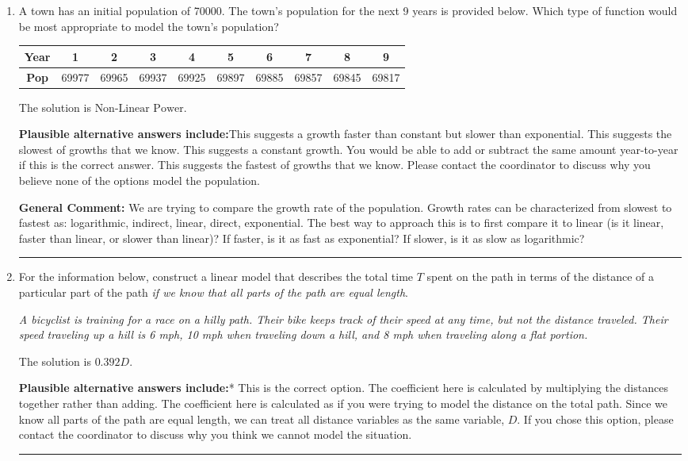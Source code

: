 \documentclass{extbook}[14pt]
\newcommand{\litem}[1]{\item #1

\rule{\textwidth}{0.4pt}}
\begin{document}
\begin{enumerate}\litem{
A town has an initial population of 70000. The town's population for the next 9 years is provided below. Which type of function would be most appropriate to model the town's population?


\begin{tabular}{c|c|c|c|c|c|c|c|c|c}
\textbf{Year} &1 &2 &3 &4 &5 &6 &7 &8 &9\tabularnewline \hline
\textbf{Pop} &69977 &69965 &69937 &69925 &69897 &69885 &69857 &69845 &69817\end{tabular}The solution is \( \text{Non-Linear Power} \).\begin{enumerate}[label=\Alph*.]
\textbf{Plausible alternative answers include:}This suggests a growth faster than constant but slower than exponential.
This suggests the slowest of growths that we know.
This suggests a constant growth. You would be able to add or subtract the same amount year-to-year if this is the correct answer.
This suggests the fastest of growths that we know.
Please contact the coordinator to discuss why you believe none of the options model the population.
\end{enumerate}

\textbf{General Comment:} We are trying to compare the growth rate of the population. Growth rates can be characterized from slowest to fastest as: logarithmic, indirect, linear, direct, exponential. The best way to approach this is to first compare it to linear (is it linear, faster than linear, or slower than linear)? If faster, is it as fast as exponential? If slower, is it as slow as logarithmic?
}
\litem{
For the information below, construct a linear model that describes the total time $T$ spent on the path in terms of the distance of a particular part of the path \textit{if we know that all parts of the path are equal length}.

\begin{center}
    \textit{ A bicyclist is training for a race on a hilly path. Their bike keeps track of their speed at any time, but not the distance traveled. Their speed traveling up a hill is 6 mph, 10 mph when traveling down a hill, and 8 mph when traveling along a flat portion. }
\end{center}
The solution is \( 0.392 D \).\begin{enumerate}[label=\Alph*.]
\textbf{Plausible alternative answers include:}* This is the correct option.
The coefficient here is calculated by multiplying the distances together rather than adding.
The coefficient here is calculated as if you were trying to model the distance on the total path.
Since we know all parts of the path are equal length, we can treat all distance variables as the same variable, $D$.
If you chose this option, please contact the coordinator to discuss why you think we cannot model the situation.
\end{enumerate}

}
\end{enumerate}
\end{document}

